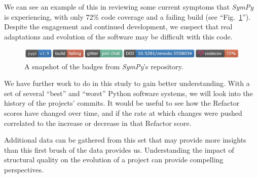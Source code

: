 \documentclass[12pt,conference]{IEEEtran}
\begin{document}
We can see an example of this in reviewing some current symptoms that \emph{SymPy} is experiencing, with only 72\% code coverage and a failing build (see ``Fig.~\ref{figSymPyStatus}''). Despite the engagement and continued development, we suspect that real adaptations and evolution of the software may be difficult with this code.

\begin{figure}[ht]
    \centerline{
        \includegraphics[width=1.0\columnwidth]{SymPy_status}
    }
    \caption{A snapshot of the badges from \emph{SymPy}'s repository.}
    \label{figSymPyStatus}
\end{figure}

We have further work to do in this study to gain better understanding. With a set of several ``best'' and ``worst'' Python software systems, we will look into the history of the projects' commits. It would be useful to see how the Refactor scores have changed over time, and if the rate at which changes were pushed correlated to the increase or decrease in that Refactor score. 

Additional data can be gathered from this set that may provide more insights than this first brush of the data provides us. Understanding the impact of structural quality on the evolution of a project can provide compelling perspectives.

\newpage





\end{document}
